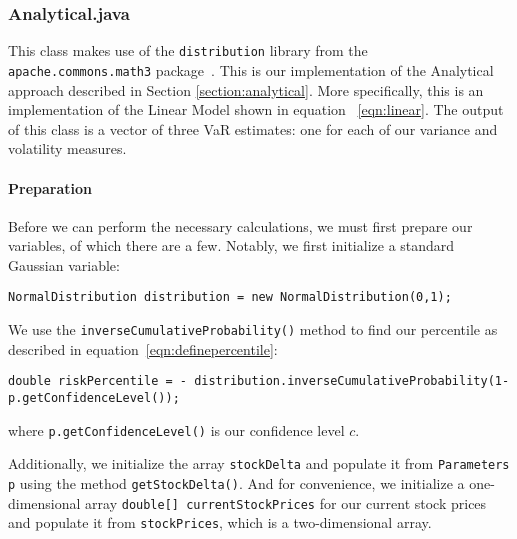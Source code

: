 \documentclass[../Dissertation.tex]{subfiles}
\begin{document}
\subsubsection{Analytical.java}

This class makes use of the \lstinline|distribution| library from the \lstinline|apache.commons.math3| package~\cite{Apache:Math3}.
This is our implementation of the Analytical approach described in Section \ref{section:analytical}.
More specifically, this is an implementation of the Linear Model shown in equation ~\ref{eqn:linear}.
The output of this class is a vector of three VaR estimates: one for each of our variance and volatility measures.

\paragraph{Preparation}
Before we can perform the necessary calculations, we must first prepare our variables, of which there are a few.
Notably, we first initialize a standard Gaussian variable:
\begin{lstlisting}[firstnumber=14]
	NormalDistribution distribution = new NormalDistribution(0,1);
\end{lstlisting}
We use the \lstinline|inverseCumulativeProbability()| method to find our percentile as described in equation~\ref{eqn:definepercentile}:
\begin{lstlisting}[firstnumber = 15]
	double riskPercentile = - distribution.inverseCumulativeProbability(1-p.getConfidenceLevel());
\end{lstlisting}
where \lstinline|p.getConfidenceLevel()| is our confidence level $c$.

Additionally, we initialize the array \lstinline|stockDelta| and populate it from \lstinline|Parameters p| using the method \lstinline|getStockDelta()|.
And for convenience, we initialize a one-dimensional array \lstinline|double[] currentStockPrices| for our current stock prices  and populate it from \lstinline|stockPrices|, which is a two-dimensional array.
\end{document}
